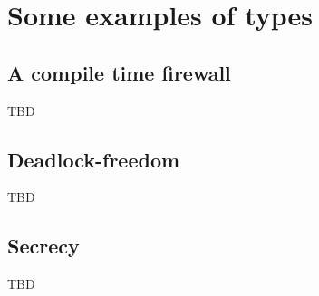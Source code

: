 \section{Some examples of types}
\subsection{A compile time firewall}
TBD

\subsection{Deadlock-freedom}
TBD

\subsection{Secrecy}
TBD
